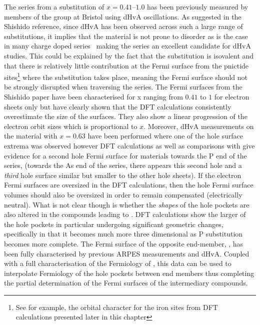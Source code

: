 The \BaFePAs series from a substitution of $x=0.41$--$1.0$ has been previously measured by members of the group at Bristol using dHvA oscillations\cite{Shishido2010}. As suggested in the Shishido reference, since dHvA has been observed across such a large range of substitutions, it implies that the material is not prone to disorder as is the case in many charge doped series~\cite{VanderBeek2010} making the series an excellent candidate for dHvA studies. This could be explained by the fact that the substitution is isovalent and that there is relatively little contribution at the Fermi surface from the pnictide sites\footnote{See for example, the orbital character for the iron sites from \ac{DFT} calculations presented later in this chapter} where the substitution takes place, meaning the Fermi surface should not be strongly disrupted when traversing the series. The Fermi surfaces from the Shishido paper have been characterised for x ranging from $0.41$ to $1$ for electron sheets only but have clearly shown that the DFT calculations consistently overestimate the size of the surfaces. They also show a linear progression of the electron orbit sizes which is proportional to $x$. Moreover, dHvA measurements on the material with $x=0.63$ have been performed where one of the hole surface extrema was observed\cite{Analytis2010c} however DFT calculations as well as comparisons with \SrFeP\cite{Analytis2009} give evidence for a second hole Fermi surface for materials towards the P end of the series, (towards the As end of the series, there appears this second hole and a \emph{third} hole surface similar but smaller to the other hole sheets). If the electron Fermi surfaces are oversized in the DFT calculations, then the hole Fermi surface volumes should also be oversized in order to remain compensated (electrically neutral). What is not clear though is whether the \emph{shapes} of the hole pockets are also altered in the compounds leading to \BaFeP. DFT calculations show the larger of the hole pockets in particular undergoing significant geometric changes, specifically in that it becomes much more three dimensional as P substitution becomes more complete. The Fermi surface of the opposite end-member, \BaFeAs, has been fully characterised by previous \ac{ARPES} measurements\cite{Kondo2010a} and dHvA\cite{Terashima2011, Analytis2010b}. Coupled with a full characterisation of the Fermiology of \BaFeP, this data can be used to interpolate Fermiology of the hole pockets between end members thus completing the partial determination of the Fermi surfaces of the intermediary compounds.

